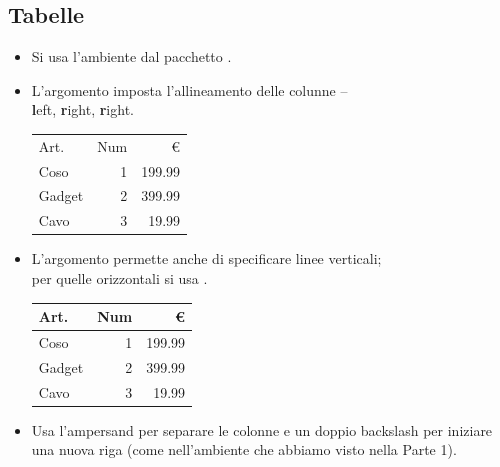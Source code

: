 \documentclass{beamer}
\begin{document}
\subsection{Tabelle}
\begin{frame}[fragile]{\insertsubsection}
\begin{itemize}
\item Si usa l'ambiente  dal pacchetto .
\item L'argomento imposta l'allineamento delle colunne --\\
\textbf{l}eft, \textbf{r}ight, \textbf{r}ight.
\begin{exampletwouptiny}
\begin{tabular}{lrr}
Art.   & Num & \euro \\
Coso   & 1   & 199.99  \\
Gadget & 2   & 399.99  \\
Cavo   & 3   & 19.99   \\
\end{tabular}
\end{exampletwouptiny}
\item L'argomento permette anche di specificare linee verticali;\\per quelle orizzontali si usa .
\begin{exampletwouptiny}
\begin{tabular}{|l|r|r|} \hline
Art.   & Num & \euro   \\\hline
Coso   & 1   & 199.99  \\
Gadget & 2   & 399.99  \\
Cavo   & 3   & 19.99   \\\hline
\end{tabular}
\end{exampletwouptiny}
\item Usa l'ampersand \keystrokebftt{\&} per separare le colonne e un doppio backslash \keystrokebftt{\bs\bs} per iniziare una nuova riga
(come nell'ambiente  che abbiamo visto nella Parte 1).
\end{itemize}
\end{frame}

\end{document}
